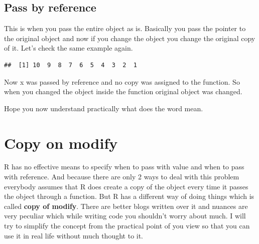 \documentclass[
]{book}
\newenvironment{Shaded}{\begin{snugshade}}{\end{snugshade}}
\newcommand{\ControlFlowTok}[1]{\textcolor[rgb]{0.13,0.29,0.53}{\textbf{#1}}}
\newcommand{\DecValTok}[1]{\textcolor[rgb]{0.00,0.00,0.81}{#1}}
\newcommand{\FunctionTok}[1]{\textcolor[rgb]{0.00,0.00,0.00}{#1}}
\newcommand{\NormalTok}[1]{#1}
\newcommand{\OtherTok}[1]{\textcolor[rgb]{0.56,0.35,0.01}{#1}}
\newcommand{\SpecialCharTok}[1]{\textcolor[rgb]{0.00,0.00,0.00}{#1}}
\begin{document}
\hypertarget{pass-by-reference}{%
\subsection{Pass by reference}\label{pass-by-reference}}

This is when you pass the entire object as is. Basically you pass the pointer to the original object and now if you change the object you change the original copy of it. Let's check the same example again.

\begin{Shaded}
\end{Shaded}

\begin{verbatim}
##  [1] 10  9  8  7  6  5  4  3  2  1
\end{verbatim}

Now x was passed by reference and no copy was assigned to the function. So when you changed the object inside the function original object was changed.

Hope you now understand practically what does the word mean.

\hypertarget{copy-on-modify}{%
\section{Copy on modify}\label{copy-on-modify}}

R has no effective means to specify when to pass with value and when to pass with reference. And because there are only 2 ways to deal with this problem everybody assumes that R does create a copy of the object every time it passes the object through a function. But R has a different way of doing things which is called \textbf{copy of modify}. There are better blogs written over it and nuances are very peculiar which while writing code you shouldn't worry about much. I will try to simplify the concept from the practical point of you view so that you can use it in real life without much thought to it.
\end{document}
